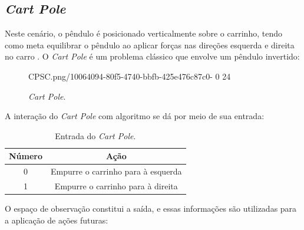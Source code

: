 \documentclass[12pt,           %
a4paper,                       %
openany,                       %
oneside,                       %
chapter=TITLE,                 %
english,                       %
spanish,                       %
brazil,                        %
sumario=tradicional]{abntex2}  %
\begin{document}
\begin{OnehalfSpace}
\subsection{\textit{Cart Pole}}
\label{sec:AE}

Neste cenário, o pêndulo é posicionado verticalmente sobre o carrinho, tendo como meta equilibrar o pêndulo ao aplicar forças nas direções esquerda e direita no carro \cite{cartpole}. O \textit{Cart Pole} é um problema clássico que envolve um pêndulo invertido:

\begin{figure}[H]
    \centering
    \vspace*{-0.25cm}
    \caption{\textit{Cart Pole}.}
    {CPSC.png/10064094-80f5-4740-bbfb-425e476c87c0-}%
    {0}%
    {24}%
    \label{fig:GPC1}
\end{figure}
\vspace*{-.75cm}
{\raggedright {}}

A interação do \textit{Cart Pole} com algoritmo se dá por meio de sua entrada:

\begin{table}[H]
	\centering
	\vspace*{-0.2cm}
	\caption{Entrada do \textit{Cart Pole}.}
	\begin{tabular}{|c|c|}
            \hline
            Número & Ação  \\
            \hline
            0 & Empurre o carrinho para à esquerda \\
            \hline
            1 & Empurre o carrinho para à direita \\
            \hline
	\end{tabular}  
    \label{tab:intcartpole}                 %
\end{table}
\vspace*{-0.7cm}
{\raggedright {}}

O espaço de observação constitui a saída, e essas informações são utilizadas para a aplicação de ações futuras:


\end{OnehalfSpace}
\end{document}
